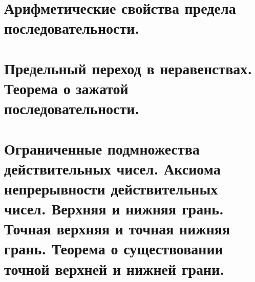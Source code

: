 \documentclass[a4paper,12pt]{article}
\begin{document}
    \subsection{}
    \subsection{}
    \subsection{}
    \subsection{}
    \subsection{}

    \newpage
    \section{Арифметические свойства предела последовательности.}

    \newpage
    \section{Предельный переход в неравенствах. Теорема о зажатой последовательности.}
    \subsection{}
    \subsection{}

    \newpage
    \section{Ограниченные подмножества действительных чисел. Аксиома непрерывности действительных чисел. Верхняя и нижняя грань. Точная верхняя и точная нижняя грань. Теорема о существовании точной верхней и нижней грани.}
    \subsection{}
    \subsection{}
\end{document}
